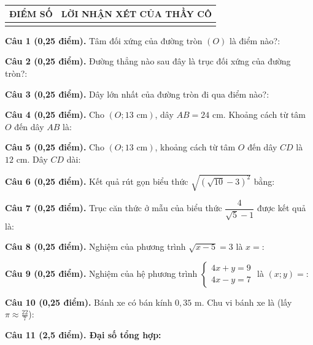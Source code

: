\documentclass[12pt,a4paper]{article}
\begin{document}
\vspace{1.0mm}

\noindent
\begin{tabularx}{\linewidth}{|p{3.2cm}|X|}
\hline
\centering\textbf{ĐIỂM SỐ} & \centering\textbf{LỜI NHẬN XÉT CỦA THẦY CÔ} \tabularnewline
\hline
\rule{0pt}{1.8cm} & \tabularnewline
\hline
\end{tabularx}

\vspace{1.2mm}
\noindent\textbf{Câu 1 (0,25 điểm).} Tâm đối xứng của đường tròn $(O)$ là điểm nào?: \par\vspace{0.6mm}
\noindent\textbf{Câu 2 (0,25 điểm).} Đường thẳng nào sau đây là trục đối xứng của đường tròn?: \par\vspace{0.6mm}
\noindent\textbf{Câu 3 (0,25 điểm).} Dây lớn nhất của đường tròn đi qua điểm nào?: \par\vspace{0.6mm}
\noindent\textbf{Câu 4 (0,25 điểm).} Cho $(O; 13\text{ cm})$, dây $AB = 24\text{ cm}$. Khoảng cách từ tâm $O$ đến dây $AB$ là: \par\vspace{0.6mm}
\noindent\textbf{Câu 5 (0,25 điểm).} Cho $(O; 13\text{ cm})$, khoảng cách từ tâm $O$ đến dây $CD$ là $12\text{ cm}$. Dây $CD$ dài: \par\vspace{0.6mm}
\noindent\textbf{Câu 6 (0,25 điểm).} Kết quả rút gọn biểu thức $\sqrt{(\sqrt{10} - 3)^2}$ bằng: \par\vspace{0.6mm}
\noindent\textbf{Câu 7 (0,25 điểm).} Trục căn thức ở mẫu của biểu thức $\dfrac{4}{\sqrt{5}-1}$ được kết quả là: \par\vspace{0.6mm}
\noindent\textbf{Câu 8 (0,25 điểm).} Nghiệm của phương trình $\sqrt{x - 5} = 3$ là $x = $: \par\vspace{0.6mm}
\noindent\textbf{Câu 9 (0,25 điểm).} Nghiệm của hệ phương trình $\begin{cases} 4x + y = 9 \\ 4x - y = 7 \end{cases}$ là $(x; y) = $: \par\vspace{0.6mm}
\noindent\textbf{Câu 10 (0,25 điểm).} Bánh xe có bán kính $0{,}35\text{ m}$. Chu vi bánh xe là (lấy $\pi \approx \frac{22}{7}$): \par\vspace{0.6mm}
\vspace{0.8mm}
\noindent\textbf{Câu 11 (2,5 điểm). Đại số tổng hợp:}
\vspace{0.6mm}
\end{document}
